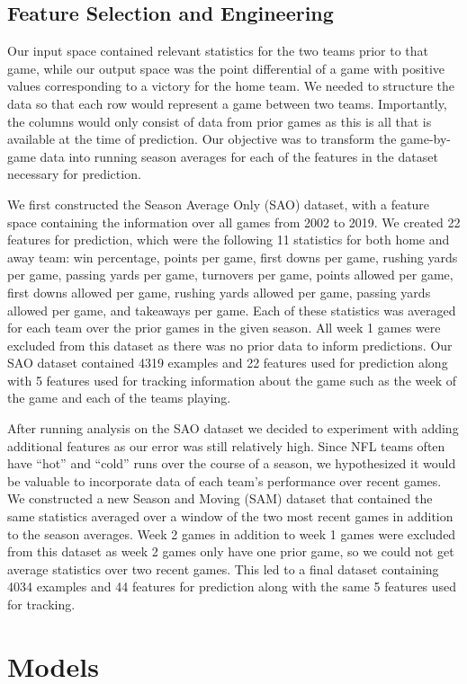 \documentclass{article}
\begin{document}
\begin{multicols}{2}
\subsection{Feature Selection and Engineering}
Our input space contained relevant statistics for the two teams prior to that game, while our output space was the point differential of a game with positive values corresponding to a victory for the home team. We needed to structure the data so that each row would represent a game between two teams. Importantly, the columns would only consist of data from prior games as this is all that is available at the time of prediction. Our objective was to transform the game-by-game data into running season averages for each of the features in the dataset necessary for prediction.

We first constructed the Season Average Only (SAO) dataset, with a feature space containing the information over all games from 2002 to 2019. We created 22 features for prediction, which were the following 11 statistics for both home and away team: win percentage, points per game, first downs per game, rushing yards per game, passing yards per game, turnovers per game, points allowed per game, first downs allowed per game, rushing yards allowed per game, passing yards allowed per game, and takeaways per game. Each of these statistics was averaged for each team over the prior games in the given season. All week 1 games were excluded from this dataset as there was no prior data to inform predictions. Our SAO dataset contained 4319 examples and 22 features used for prediction along with 5 features used for tracking information about the game such as the week of the game and each of the teams playing. 

After running analysis on the SAO dataset we decided to experiment with adding additional features as our error was still relatively high. Since NFL teams often have “hot” and “cold” runs over the course of a season, we hypothesized it would be valuable to incorporate data of each team’s performance over recent games. We constructed a new Season and Moving (SAM) dataset that contained the same statistics averaged over a window of the two most recent games in addition to the season averages. Week 2 games in addition to week 1 games were excluded from this dataset as week 2 games only have one prior game, so we could not get average statistics over two recent games. This led to a final dataset containing 4034 examples and 44 features for prediction along with the same 5 features used for tracking. 
\section{Models}

\end{multicols}
\end{document}
